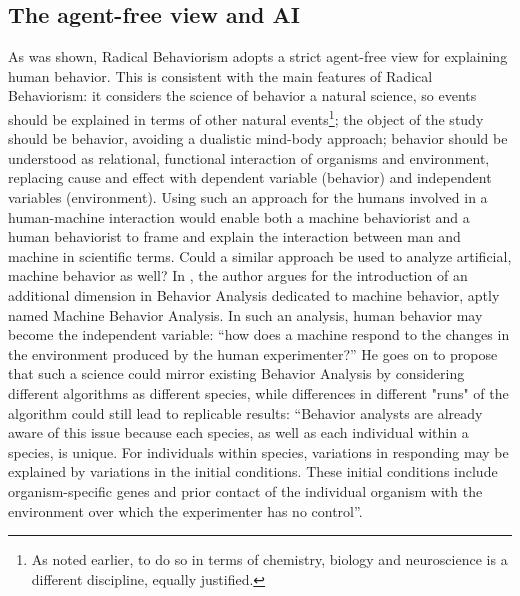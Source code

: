 \documentclass[letterpaper,11pt,twocolumn]{article}
\begin{document}
\subsection*{The agent-free view and AI}
As was shown, Radical Behaviorism adopts a strict agent-free view for explaining human behavior. This is consistent with the main features of Radical Behaviorism: it considers the science of behavior a natural science, so events should be explained in terms of other natural events\footnote{As noted earlier, to do so in terms of chemistry, biology and neuroscience is a different discipline, equally justified.}; the object of the study should be behavior, avoiding a dualistic mind-body approach; behavior should be understood as relational, functional interaction of organisms and environment, replacing cause and effect with dependent variable (behavior) and independent variables (environment). Using such an approach for the humans involved in a human-machine interaction would enable both a machine behaviorist and a human behaviorist to frame and explain the interaction between man and machine in scientific terms. Could a similar approach be used to analyze artificial, machine behavior as well? In \cite{lanovazCharacteristicsArgumentsFavor2022}, the author argues for the introduction of an additional dimension in Behavior Analysis dedicated to machine behavior, aptly named Machine Behavior Analysis. In such an analysis, human behavior may become the independent variable: \enquote{how does a machine respond to the changes in the environment produced by the human experimenter?} He goes on to propose that such a science could mirror existing Behavior Analysis by considering different algorithms as different species, while differences in different "runs" of the algorithm could still lead to replicable results: \enquote{Behavior analysts are already aware of this issue because each species, as well as each individual within a species, is unique. For individuals within species, variations in responding may be explained by variations in the initial conditions. These initial conditions include organism-specific genes and prior contact of the individual organism with the environment over which the experimenter has no control}.
\end{document}
